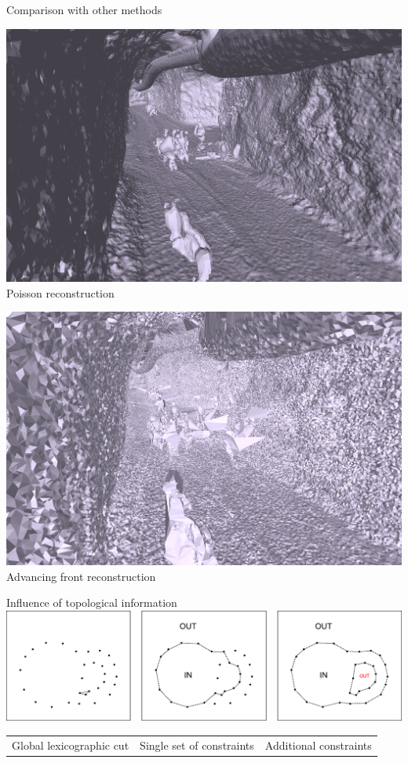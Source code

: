 \begin{frame}{Comparison with other methods}
	\begin{minipage}{0.5\linewidth}
		\centering
		\includegraphics[width=0.95\linewidth]{closed_poisson}	
		Poisson reconstruction
	\end{minipage}%
	\begin{minipage}{0.5\linewidth}
		\centering
		\includegraphics[width=0.95\linewidth]{closed_scalespace}	
		Advancing front reconstruction
	\end{minipage}
\end{frame}

\begin{frame}{Influence of topological information}
	\scriptsize
	\includegraphics[width=\linewidth]{discovering_handle}
	\begin{tabularx}{\linewidth}{@{}YYY@{}}
		Global lexicographic cut & Single set of constraints & Additional constraints
	\end{tabularx}
\end{frame}

